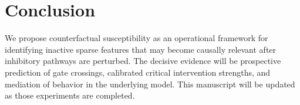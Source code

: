 \section{Conclusion}
\label{sec:conclusion}

We propose counterfactual susceptibility as an operational framework for identifying inactive sparse features that may become causally relevant after inhibitory pathways are perturbed. The decisive evidence will be prospective prediction of gate crossings, calibrated critical intervention strengths, and mediation of behavior in the underlying model. This manuscript will be updated as those experiments are completed.
